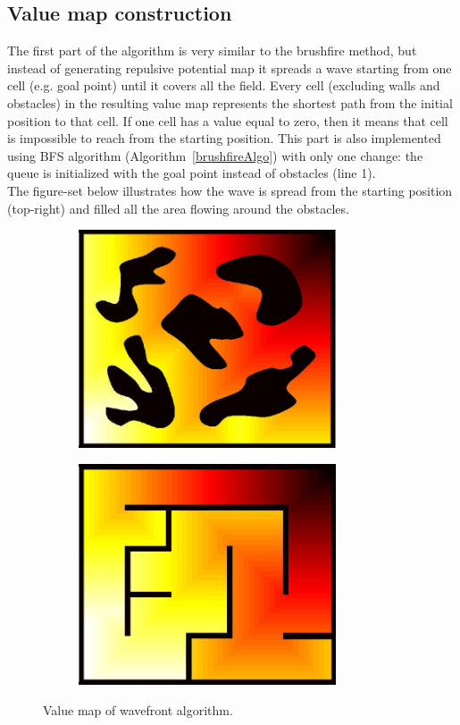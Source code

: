 \documentclass[a4paper]{article}
\begin{document}
\subsection*{Value map construction}
The first part of the algorithm is very similar to the brushfire method, but instead of generating repulsive potential map it spreads a wave starting from one cell (e.g. goal point) until it covers all the field. Every cell (excluding walls and obstacles) in the resulting value map represents the shortest path from the initial position to that cell. If one cell has a value equal to zero, then it means that cell is impossible to reach from the starting position. This part is also implemented using BFS algorithm (Algorithm~\ref{brushfireAlgo}) with only one change: the queue is initialized with the goal point instead of obstacles (line 1).\\
The figure-set below illustrates how the wave is spread from the starting position (top-right) and filled all the area flowing around the obstacles.
\begin{figure}[H]
\centering
\begin{subfigure}[t]{3in}
\includegraphics[width=3in]{wf-val-obstBig}
\end{subfigure}
\begin{subfigure}[t]{3in}
\includegraphics[width=3in]{wf-val-mazeBig}
\end{subfigure}
\caption{Value map of wavefront algorithm.}
\label{fig:wf-val-obstBig}
\end{figure}
\end{document}

